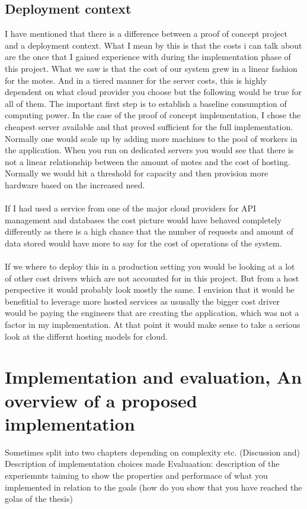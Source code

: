 \documentclass[]{uiophd}
\begin{document}
\section{Deployment context}
I have mentioned that there is a difference between a proof of concept project and a deployment context. What I mean by this is that the costs i can talk about are the once that I gained experience with during the implementation phase of this project. What we saw is that the cost of our system grew in a linear fashion for the motes. And in a tiered manner for the server costs, this is highly dependent on what cloud provider you choose but the following would be true for all of them. The important first step is to establish a baseline consumption of computing power. In the case of the proof of concept implementation, I chose the cheapest server available and that proved sufficient for the full implementation. Normally one would scale up by adding more machines to the pool of workers in the application. When you run on dedicated servers you would see that there is not a linear relationship between the amount of motes and the cost of hosting. Normally we would hit a threshold for capacity and then provision more hardware based on the increased need.
\\\\
If I had used a service from one of the major cloud providers for API management and databases the cost picture would have behaved completely differently as there is a high chance that the number of requests and amount of data stored would have more to say for the cost of operations of the system.
\\\\
If we where to deploy this in a production setting you would be looking at a lot of other cost drivers which are not accounted for in this project. But from a host perspective it would probably look mostly the same. I envision that it would be benefitial to leverage more hosted services as ususally the bigger cost driver would be paying the engineers that are creating the application, which was not a factor in my implementation. At that point it would make sense to take a serious look at the differnt hosting models for cloud.

\chapter{Implementation and evaluation, An overview of a proposed implementation}

Sometimes split into two chapters depending on complexity etc.
(Discussion and) Description of implementation choices made 
Evaluaation: description of the experiemnts taiming to show the properties 
and performace of what you implemented in relation to the goals (how do you show that you have reached the golas of the thesis)
\end{document}
